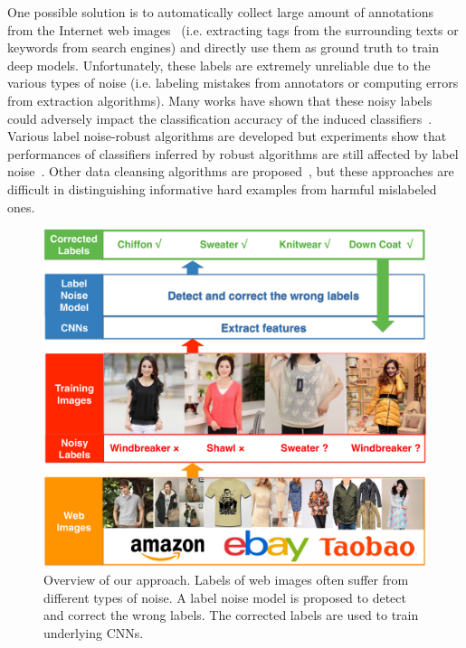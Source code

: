 \documentclass[10pt,twocolumn,letterpaper]{article}
\begin{document}
One possible solution is to automatically collect large amount of annotations from the Internet web images~\cite{gong2014multiview} (i.e. extracting tags from the surrounding texts or keywords from search engines) and directly use them as ground truth to train deep models. Unfortunately, these labels are extremely unreliable due to the various types of noise (i.e. labeling mistakes from annotators or computing errors from extraction algorithms). Many works have shown that these noisy labels could adversely impact the classification accuracy of the induced classifiers~\cite{zhu2004class,nettleton2010study,pechenizkiy2006class}. Various label noise-robust algorithms are developed but experiments show that performances of classifiers inferred by robust algorithms are still affected by label noise~\cite{bartlett2006convexity,teng2001comparison}. Other data cleansing algorithms are proposed~\cite{barandela2000decontamination,brodley2011identifying,miranda2009use}, but these approaches are difficult in distinguishing informative hard examples from harmful mislabeled ones.

\begin{figure}[t]
\begin{center}
\includegraphics[width=0.95\linewidth]{figure/overview.pdf}
\end{center}
\caption{Overview of our approach. Labels of web images often suffer from different types of noise. A label noise model is proposed to detect and correct the wrong labels. The corrected labels are used to train underlying CNNs.}
\label{fig:overview}
\end{figure}
\end{document}
